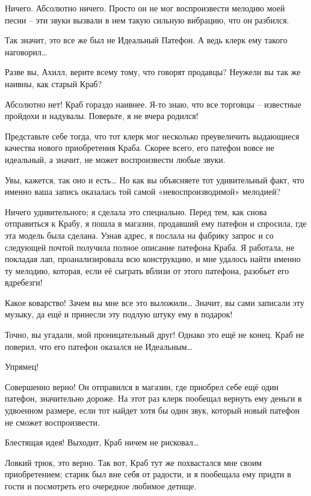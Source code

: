 \documentclass[../main.tex]{subfiles}
\begin{document}
\begin{Dialogue}
 Ничего. Абсолютно ничего. Просто он не мог воспроизвести мелодию моей песни \--- эти звуки вызвали в нем такую сильную вибрацию, что он разбился.

 Так значит, это все же был не Идеальный Патефон. А ведь клерк ему такого наговорил\ldots{}

 Разве вы, Ахилл, верите всему тому, что говорят продавцы? Неужели вы так же наивны, как старый Краб?

 Абсолютно нет! Краб гораздо наивнее. Я-то знаю, что все торговцы \--- известные пройдохи и надувалы. Поверьте, я не вчера родился!

 Представьте себе тогда, что тот клерк мог несколько преувеличить выдающиеся качества нового приобретения Краба. Скорее всего, его патефон вовсе не идеальный, а значит, не может воспроизвести любые звуки.

 Увы, кажется, так оно и есть\ldots{} Но как вы объясняете тот удивительный факт, что именно ваша запись оказалась той самой «невоспроизводимой» мелодией?

 Ничего удивительного; я сделала это специально. Перед тем, как снова отправиться к Крабу, я пошла в магазин, продавший ему патефон и спросила, где эта модель была сделана. Узнав адрес, я послала на фабрику запрос и со следующей почтой получила полное описание патефона Краба. Я работала, не покладая лап, проанализировала всю конструкцию, и мне удалось найти именно ту мелодию, которая, если её сыграть вблизи от этого патефона, разобьет его вдребезги!

 Какое коварство! Зачем вы мне все это выложили\ldots{} Значит, вы сами записали эту музыку, да ещё и принесли эту подлую штуку ему в подарок!

 Точно, вы угадали, мой проницательный друг! Однако это ещё не конец. Краб не поверил, что его патефон оказался не Идеальным\ldots{}

 Упрямец!

 Совершенно верно! Он отправился в магазин, где приобрел себе ещё один патефон, значительно дороже. На этот раз клерк пообещал вернуть ему деньги в удвоенном размере, если тот найдет хотя бы один звук, который новый патефон не сможет воспроизвести.

 {\Large Б}лестящая идея! Выходит, Краб ничем не рисковал\ldots{}

 Ловкий трюк, это верно. Так вот, Краб тут же похвастался мне своим приобретением; старик был вне себя от радости, и я пообещала ему придти в гости и посмотреть его очередное любимое детище.


\end{Dialogue}
\end{document}
